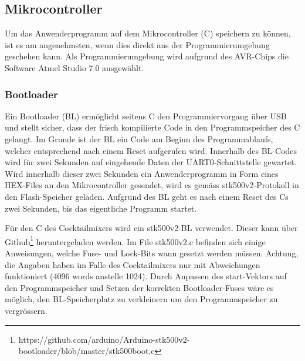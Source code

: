 \newpage
\subsection{Mikrocontroller}
\label{subsec:Inbetriebnahme_Mikrocontroller}

Um das Anwenderprogramm auf dem Mikrocontroller (\textmu C) speichern zu können, ist es am angenehmsten, wenn dies direkt aus der Programmierumgebung geschehen kann. Als Programmierumgebung wird aufgrund des AVR-Chips die Software Atmel Studio 7.0 ausgewählt.

\subsubsection{Bootloader}

Ein Bootloader (BL) ermöglicht seitens \textmu C den Programmiervorgang über USB und stellt sicher, dass der frisch kompilierte Code in den Programmspeicher des \textmu C gelangt. Im Grunde ist der BL ein Code am Beginn des Programmablaufs, welcher entsprechend nach einem Reset aufgerufen wird. Innerhalb des BL-Codes wird für zwei Sekunden auf eingehende Daten der UART0-Schnittstelle gewartet.
Wird innerhalb dieser zwei Sekunden ein Anwenderprogramm in Form eines HEX-Files an den Mikrocontroller gesendet, wird es gemäss stk500v2-Protokoll  in den Flash-Speicher geladen.
Aufgrund des BL geht es nach einem Reset des \textmu Cs zwei Sekunden, bis das eigentliche Programm startet.

Für den \textmu C des Cocktailmixers wird ein stk500v2-BL verwendet. Dieser kann über Github\footnote{https://github.com/arduino/Arduino-stk500v2-bootloader/blob/master/stk500boot.c
} heruntergeladen werden. Im File stk500v2.c befinden sich einige Anweisungen, welche Fuse- und Lock-Bits wann gesetzt werden müssen. Achtung, die Angaben haben im Falle des Cocktailmixers nur mit Abweichungen funktioniert (4096 words anstelle 1024). Durch Anpassen des start-Vektors auf den Programmspeicher und Setzen der korrekten Bootloader-Fuses wäre es möglich, den BL-Speicherplatz zu verkleinern um den Programmspeicher zu vergrössern.


